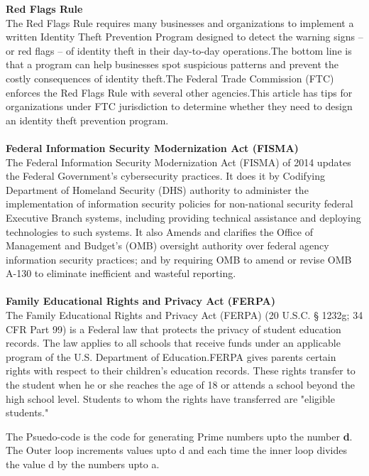 \documentclass[fleqn,letterpaper,12pt]{report}
\begin{document}
\assignmenttitle

%
{}
\problem
{\bf Red Flags Rule }\\
The Red Flags Rule requires many businesses and organizations to implement a written Identity Theft Prevention Program designed to detect the warning signs – or red flags – of identity theft in their day-to-day operations.The bottom line is that a program can help businesses spot suspicious patterns and prevent the costly consequences of identity theft.The Federal Trade Commission (FTC) enforces the Red Flags Rule with several other agencies.This article has tips for organizations under FTC jurisdiction to determine whether they need to design an identity theft prevention program.\cite{RF}\\
\\
{\bf Federal Information Security Modernization Act (FISMA)}\\
The Federal Information Security Modernization Act (FISMA) of 2014 updates the Federal Government's cybersecurity practices. It does it by Codifying Department of Homeland Security (DHS) authority to administer the implementation of information security policies for non-national security federal Executive Branch systems, including providing technical assistance and deploying technologies to such systems. It also 
Amends and clarifies the Office of Management and Budget's (OMB) oversight authority over federal agency information security practices; and by requiring OMB to amend or revise OMB A-130 to eliminate inefficient and wasteful reporting.\cite{FIMA}\\
\\
{\bf Family Educational Rights and Privacy Act (FERPA)}\\
The Family Educational Rights and Privacy Act (FERPA) (20 U.S.C. § 1232g; 34 CFR Part 99) is a Federal law that protects the privacy of student education records. The law applies to all schools that receive funds under an applicable program of the U.S. Department of Education.FERPA gives parents certain rights with respect to their children's education records. These rights transfer to the student when he or she reaches the age of 18 or attends a school beyond the high school level. Students to whom the rights have transferred are "eligible students."\cite{FE}




%
\newpage
{}
{}
\problem
The Psuedo-code is the code for generating Prime numbers upto the number {\bf d}. The Outer loop increments values upto d and each time the inner loop divides the value d by the numbers upto a. 
\end{document}
